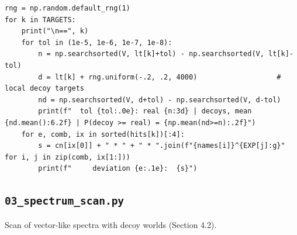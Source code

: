 \documentclass[11pt,a4paper]{article}
\begin{document}
\begin{lstlisting}
rng = np.random.default_rng(1)
for k in TARGETS:
    print("\n==", k)
    for tol in (1e-5, 1e-6, 1e-7, 1e-8):
        n = np.searchsorted(V, lt[k]+tol) - np.searchsorted(V, lt[k]-tol)
        d = lt[k] + rng.uniform(-.2, .2, 4000)                   # local decoy targets
        nd = np.searchsorted(V, d+tol) - np.searchsorted(V, d-tol)
        print(f"  tol {tol:.0e}: real {n:3d} | decoys, mean {nd.mean():6.2f} | P(decoy >= real) = {np.mean(nd>=n):.2f}")
    for e, comb, ix in sorted(hits[k])[:4]:
        s = cn[ix[0]] + " * " + " * ".join(f"{names[i]}^{EXP[j]:g}" for i, j in zip(comb, ix[1:]))
        print(f"     deviation {e:.1e}:  {s}")
\end{lstlisting}

\subsection{\texttt{03\_spectrum\_scan.py}}
Scan of vector-like spectra with decoy worlds (Section 4.2).
\end{document}
